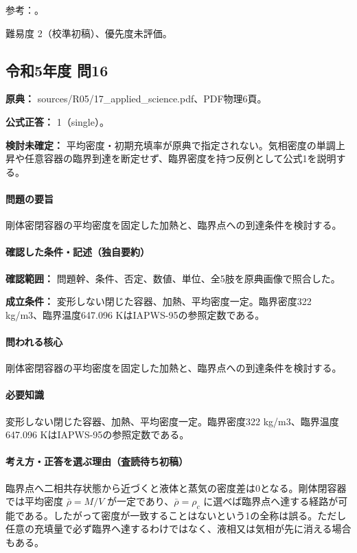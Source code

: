 \par 参考：\cite{mit_thermo_firstlaw2008,iupac_greenbook2012}。

\par 難易度 2（校準初稿）、優先度未評価。

\subsection{令和5年度 問16}
\label{q:r05-reg-applied-16}

\noindent\textbf{原典：} sources/R05/17\_applied\_science.pdf、PDF物理6頁。

\textbf{公式正答：} 1（single）。

\par\textbf{検討未確定：} 平均密度・初期充填率が原典で指定されない。気相密度の単調上昇や任意容器の臨界到達を断定せず、臨界密度を持つ反例として公式1を説明する。

\paragraph{問題の要旨} 剛体密閉容器の平均密度を固定した加熱と、臨界点への到達条件を検討する。

\paragraph{確認した条件・記述（独自要約）}\mbox{}\par

\noindent\textbf{確認範囲：} 問題幹、条件、否定、数値、単位、全5肢を原典画像で照合した。\par

\noindent\textbf{成立条件：} 変形しない閉じた容器、加熱、平均密度一定。臨界密度322 kg/m3、臨界温度647.096 KはIAPWS-95の参照定数である。\par

\paragraph{問われる核心} 剛体密閉容器の平均密度を固定した加熱と、臨界点への到達条件を検討する。

\paragraph{必要知識} 変形しない閉じた容器、加熱、平均密度一定。臨界密度322 kg/m3、臨界温度647.096 KはIAPWS-95の参照定数である。

\paragraph{考え方・正答を選ぶ理由（査読待ち初稿）} 臨界点へ二相共存状態から近づくと液体と蒸気の密度差は0となる。剛体閉容器では平均密度 \(\bar\rho=M/V\) が一定であり、\(\bar\rho=\rho_c\) に選べば臨界点へ達する経路が可能である。したがって密度が一致することはないという1の全称は誤る。ただし任意の充填量で必ず臨界へ達するわけではなく、液相又は気相が先に消える場合もある。

